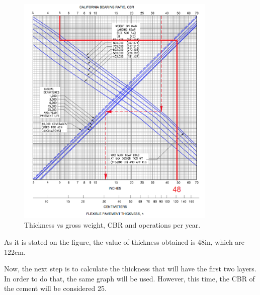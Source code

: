 		\begin{figure}[H]
			\centering
			\includegraphics[clip, trim=0cm 0cm 0cm 0cm, width=0.85\textwidth]{./images/pavement/B777/thickness}
			\caption{Thickness vs gross weight, CBR and operations per year.}
			\label{} %
		\end{figure}
	
		As it is stated on the figure, the  value of thickness obtained is 48in, which are 122cm. 
		
		Now, the next step is to calculate the thickness that will have the first two layers. In order to do that, the same graph will be used. However, this time, the CBR of the cement will be considered 25. 
		
